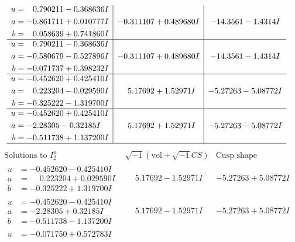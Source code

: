 \documentclass[1p]{elsarticle_modified}
\theoremstyle{definition}
\newcommand{\I}{\sqrt{-1}}
\begin{document}
$$\begin{array}{c|c|c}
\begin{aligned}
u &= \phantom{-}0.790211 - 0.368636 I \\
a &= -0.861711 + 0.010777 I \\
b &= \phantom{-}0.058639 + 0.741860 I\end{aligned}
 & -0.311107 + 0.489680 I & -14.3561 - 1.4314 I \\ \hline\begin{aligned}
u &= \phantom{-}0.790211 - 0.368636 I \\
a &= -0.580679 - 0.527896 I \\
b &= -0.071737 + 0.398232 I\end{aligned}
 & -0.311107 + 0.489680 I & -14.3561 - 1.4314 I \\ \hline\begin{aligned}
u &= -0.452620 + 0.425410 I \\
a &= \phantom{-}0.223204 - 0.029590 I \\
b &= -0.325222 - 1.319700 I\end{aligned}
 & \phantom{-}5.17692 + 1.52971 I & -5.27263 - 5.08772 I \\ \hline\begin{aligned}
u &= -0.452620 + 0.425410 I \\
a &= -2.28305 - 0.32185 I \\
b &= -0.511738 + 1.137200 I\end{aligned}
 & \phantom{-}5.17692 + 1.52971 I & -5.27263 - 5.08772 I\\
 \hline 
 \end{array}$$\newpage$$\begin{array}{c|c|c}  
\text{Solutions to }I^u_{2}& \I (\text{vol} + \sqrt{-1}CS) & \text{Cusp shape}\\
 \hline 
\begin{aligned}
u &= -0.452620 - 0.425410 I \\
a &= \phantom{-}0.223204 + 0.029590 I \\
b &= -0.325222 + 1.319700 I\end{aligned}
 & \phantom{-}5.17692 - 1.52971 I & -5.27263 + 5.08772 I \\ \hline\begin{aligned}
u &= -0.452620 - 0.425410 I \\
a &= -2.28305 + 0.32185 I \\
b &= -0.511738 - 1.137200 I\end{aligned}
 & \phantom{-}5.17692 - 1.52971 I & -5.27263 + 5.08772 I \\ \hline\begin{aligned}
u &= -0.071750 + 0.572783 I \\

\end{aligned}
\end{array}$$
\end{document}
